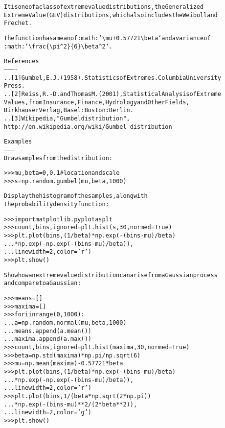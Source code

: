 \begin{boxedminipage}{\funcwidth}
\begin{alltt}
It is one of a class of extreme value distributions, the Generalized
Extreme Value (GEV) distributions, which also includes the Weibull and
Frechet.

The function has a mean of :math:`{\textbackslash}mu + 0.57721{\textbackslash}beta` and a variance of
:math:`{\textbackslash}frac\{{\textbackslash}pi{\textasciicircum}2\}\{6\}{\textbackslash}beta{\textasciicircum}2`.

References
----------
.. [1] Gumbel, E.J. (1958). Statistics of Extremes. Columbia University
       Press.
.. [2] Reiss, R.-D. and Thomas M. (2001), Statistical Analysis of Extreme
       Values, from Insurance, Finance, Hydrology and Other Fields,
       Birkhauser Verlag, Basel: Boston : Berlin.
.. [3] Wikipedia, "Gumbel distribution",
       http://en.wikipedia.org/wiki/Gumbel\_distribution

Examples
--------
Draw samples from the distribution:

{\textgreater}{\textgreater}{\textgreater} mu, beta = 0, 0.1 \# location and scale
{\textgreater}{\textgreater}{\textgreater} s = np.random.gumbel(mu, beta, 1000)

Display the histogram of the samples, along with
the probability density function:

{\textgreater}{\textgreater}{\textgreater} import matplotlib.pyplot as plt
{\textgreater}{\textgreater}{\textgreater} count, bins, ignored = plt.hist(s, 30, normed=True)
{\textgreater}{\textgreater}{\textgreater} plt.plot(bins, (1/beta)*np.exp(-(bins - mu)/beta)
...          * np.exp( -np.exp( -(bins - mu) /beta) ),
...          linewidth=2, color='r')
{\textgreater}{\textgreater}{\textgreater} plt.show()

Show how an extreme value distribution can arise from a Gaussian process
and compare to a Gaussian:

{\textgreater}{\textgreater}{\textgreater} means = []
{\textgreater}{\textgreater}{\textgreater} maxima = []
{\textgreater}{\textgreater}{\textgreater} for i in range(0,1000) :
...    a = np.random.normal(mu, beta, 1000)
...    means.append(a.mean())
...    maxima.append(a.max())
{\textgreater}{\textgreater}{\textgreater} count, bins, ignored = plt.hist(maxima, 30, normed=True)
{\textgreater}{\textgreater}{\textgreater} beta = np.std(maxima)*np.pi/np.sqrt(6)
{\textgreater}{\textgreater}{\textgreater} mu = np.mean(maxima) - 0.57721*beta
{\textgreater}{\textgreater}{\textgreater} plt.plot(bins, (1/beta)*np.exp(-(bins - mu)/beta)
...          * np.exp(-np.exp(-(bins - mu)/beta)),
...          linewidth=2, color='r')
{\textgreater}{\textgreater}{\textgreater} plt.plot(bins, 1/(beta * np.sqrt(2 * np.pi))
...          * np.exp(-(bins - mu)**2 / (2 * beta**2)),
...          linewidth=2, color='g')
{\textgreater}{\textgreater}{\textgreater} plt.show()
\end{alltt}

\setlength{\parskip}{1ex}
    \end{boxedminipage}

